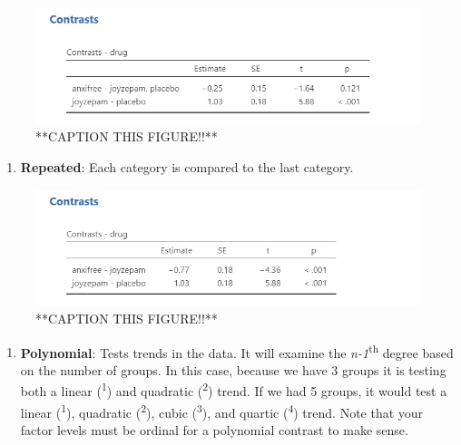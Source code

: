 \documentclass[
]{book}
\providecommand{\tightlist}{%
  \setlength{\itemsep}{0pt}\setlength{\parskip}{0pt}}
\begin{document}
\begin{figure}

{\centering \includegraphics[width=1\linewidth]{images/04_one-way-anova/contrasts_helmert} 

}

\caption{**CAPTION THIS FIGURE!!**}\label{fig:unnamed-chunk-11}
\end{figure}

\begin{enumerate}
\def\labelenumi{\arabic{enumi}.}
\setcounter{enumi}{4}
\tightlist
\item
  \textbf{Repeated}: Each category is compared to the last category.
\end{enumerate}

\begin{figure}

{\centering \includegraphics[width=1\linewidth]{images/04_one-way-anova/contrasts_repeated} 

}

\caption{**CAPTION THIS FIGURE!!**}\label{fig:unnamed-chunk-12}
\end{figure}

\begin{enumerate}
\def\labelenumi{\arabic{enumi}.}
\setcounter{enumi}{5}
\tightlist
\item
  \textbf{Polynomial}: Tests trends in the data. It will examine the \emph{n-1}\textsuperscript{th} degree based on the number of groups. In this case, because we have 3 groups it is testing both a linear (\textsuperscript{1}) and quadratic (\textsuperscript{2}) trend. If we had 5 groups, it would test a linear (\textsuperscript{1}), quadratic (\textsuperscript{2}), cubic (\textsuperscript{3}), and quartic (\textsuperscript{4}) trend. Note that your factor levels must be ordinal for a polynomial contrast to make sense.
\end{enumerate}
\end{document}
